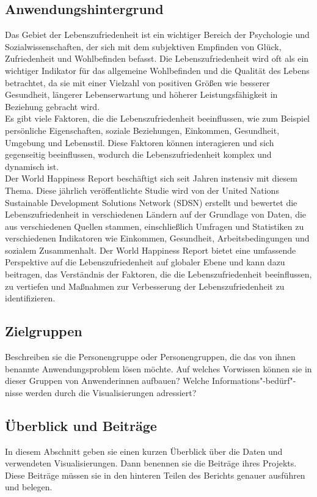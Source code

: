 \subsection{Anwendungshintergrund}
Das Gebiet der Lebenszufriedenheit ist ein wichtiger Bereich der Psychologie und Sozialwissenschaften, der sich mit dem subjektiven Empfinden von Glück, Zufriedenheit und Wohlbefinden befasst. Die Lebenszufriedenheit wird oft als ein wichtiger Indikator für das allgemeine Wohlbefinden und die Qualität des Lebens betrachtet, da sie mit einer Vielzahl von positiven Größen wie besserer Gesundheit, längerer Lebenserwartung und höherer Leistungsfähigkeit in Beziehung gebracht wird.
\\
Es gibt viele Faktoren, die die Lebenszufriedenheit beeinflussen, wie zum Beispiel persönliche Eigenschaften, soziale Beziehungen, Einkommen, Gesundheit, Umgebung und Lebensstil. Diese Faktoren können interagieren und sich gegenseitig beeinflussen, wodurch die Lebenszufriedenheit komplex und dynamisch ist.
\\
Der World Happiness Report beschäftigt sich seit Jahren instensiv mit diesem Thema. Diese jährlich veröffentlichte Studie wird von der United Nations Sustainable Development Solutions Network (SDSN) erstellt und bewertet die Lebenszufriedenheit in verschiedenen Ländern auf der Grundlage von Daten, die aus verschiedenen Quellen stammen, einschließlich Umfragen und Statistiken zu verschiedenen Indikatoren wie Einkommen, Gesundheit, Arbeitsbedingungen und sozialem Zusammenhalt. Der World Happiness Report bietet eine umfassende Perspektive auf die Lebenszufriedenheit auf globaler Ebene und kann dazu beitragen, das Verständnis der Faktoren, die die Lebenszufriedenheit beeinflussen, zu vertiefen und Maßnahmen zur Verbesserung der Lebenszufriedenheit zu identifizieren. 


\subsection{Zielgruppen}

Beschreiben sie die Personengruppe oder Personengruppen, die das von ihnen benannte Anwendungsproblem lösen möchte. Auf welches Vorwissen können sie in dieser Gruppen von Anwenderinnen aufbauen? Welche Informations"-bedürf"-nisse werden durch die Visualisierungen adressiert?
\subsection{Überblick und Beiträge}
In diesem Abschnitt geben sie einen kurzen Überblick über die Daten und verwendeten Visualisierungen. Dann benennen sie die Beiträge ihres Projekts. Diese Beiträge müssen sie in den hinteren Teilen des Berichts genauer ausführen und belegen.

